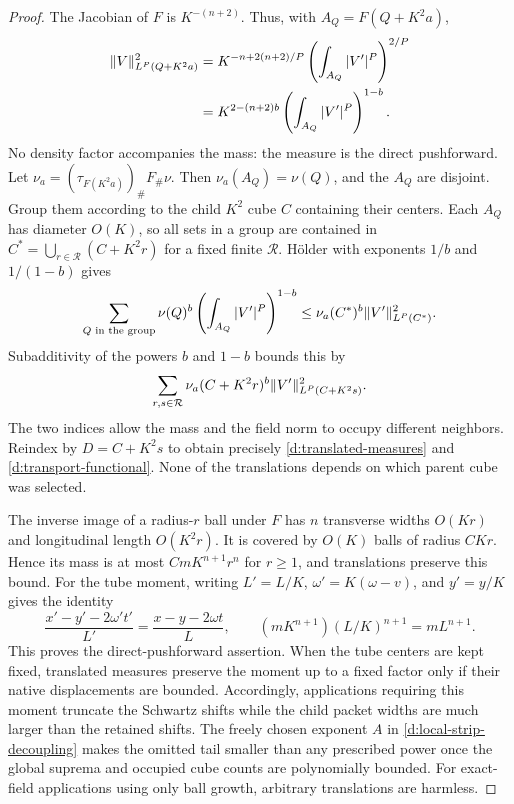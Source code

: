 \begin{proof}
The Jacobian of $F$ is $K^{-(n+2)}$.  Thus, with
$A_Q=F(Q+K^2a)$,
\begin{align*}
 \lVert V\rVert_{L^P(Q+K^2a)}^2
 &=K^{-n+2(n+2)/P}
          \left(\int_{A_Q}|V'|^P\right)^{2/P}\\
 &=K^{2-(n+2)b}
          \left(\int_{A_Q}|V'|^P\right)^{1-b}.
\end{align*}
No density factor accompanies the mass: the measure is the direct
pushforward.  Let $\nu_a=(\tau_{F(K^2a)})_\#F_\#\nu$.
Then $\nu_a(A_Q)=\nu(Q)$, and the $A_Q$ are disjoint.
Group them according to the child $K^2$ cube $C$ containing their
centers.  Each $A_Q$ has diameter $O(K)$, so all sets in a group are
contained in
$C^*=\bigcup_{r\in\mathcal R}(C+K^2r)$ for a fixed finite
$\mathcal R$.  Hölder with exponents $1/b$ and $1/(1-b)$ gives
\[
 \sum_{Q\text{ in the group}}\nu(Q)^b
          \left(\int_{A_Q}|V'|^P\right)^{1-b}
 \le \nu_a(C^*)^b\lVert V'\rVert_{L^P(C^*)}^2.
\]
Subadditivity of the powers $b$ and $1-b$ bounds this by
\[
 \sum_{r,s\in\mathcal R}\nu_a(C+K^2r)^b
                      \lVert V'\rVert_{L^P(C+K^2s)}^2.
\]
The two indices allow the mass and the field norm to occupy different
neighbors.  Reindex by $D=C+K^2s$ to obtain precisely
\eqref{d:translated-measures} and
\eqref{d:transport-functional}.  None of the translations depends on
which parent cube was selected.

The inverse image of a radius-$r$ ball under $F$ has $n$ transverse
widths $O(Kr)$ and longitudinal length $O(K^2r)$.  It is covered by
$O(K)$ balls of radius $CKr$.  Hence its mass is at most
$CmK^{n+1}r^n$ for $r\ge1$, and translations preserve this bound.
For the tube moment, writing $L'=L/K$,
$\omega'=K(\omega-v)$, and $y'=y/K$ gives the identity
\[
 \frac{x'-y'-2\omega't'}{L'}
       =\frac{x-y-2\omega t}{L},
 \qquad (mK^{n+1})(L/K)^{n+1}=mL^{n+1}.
\]
This proves the direct-pushforward assertion.  When the tube centers
are kept fixed, translated measures preserve the moment up to a fixed
factor only if their native displacements are bounded.  Accordingly,
applications requiring this moment truncate the Schwartz shifts while
the child packet widths are much larger than the retained shifts.
The freely chosen exponent $A$ in
\eqref{d:local-strip-decoupling} makes the omitted tail smaller than
any prescribed power once the global suprema and occupied cube counts
are polynomially bounded.  For exact-field applications using only
ball growth, arbitrary translations are harmless.
\end{proof}

